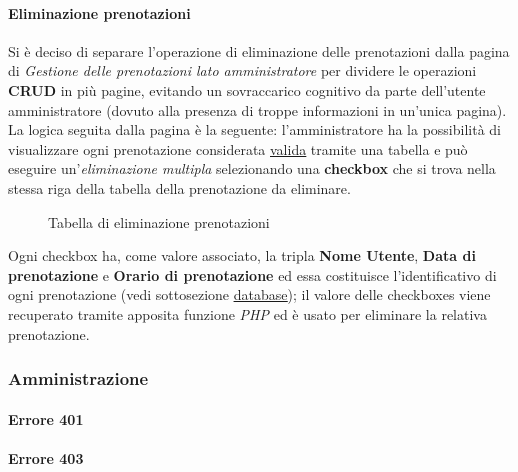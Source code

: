 \documentclass[]{article}
\begin{document}
\paragraph*{Eliminazione prenotazioni}
Si è deciso di separare l'operazione di eliminazione delle prenotazioni dalla pagina di \textit{Gestione delle prenotazioni lato amministratore} per dividere le operazioni \textbf{CRUD} in più pagine, evitando un sovraccarico cognitivo da parte dell'utente amministratore (dovuto alla presenza di troppe informazioni in un'unica pagina). \\
La logica seguita dalla pagina è la seguente: l'amministratore ha la possibilità di visualizzare ogni prenotazione considerata \hyperref[prenotazioni:valida]{\underline{valida}} tramite una tabella e può eseguire un'\textit{eliminazione multipla} selezionando una \textbf{checkbox} che si trova nella stessa riga della tabella della prenotazione da eliminare. \\

\begin{figure}[H]
	\centering
	\caption{Tabella di eliminazione prenotazioni}
\end{figure}

Ogni checkbox ha, come valore associato, la tripla \textbf{Nome Utente}, \textbf{Data di prenotazione} e \textbf{Orario di prenotazione} ed essa costituisce l'identificativo di ogni prenotazione (vedi sottosezione \hyperref[subsec:database]{\underline{database}}); il valore delle checkboxes viene recuperato tramite apposita funzione \textit{PHP} ed è usato per eliminare la relativa prenotazione.

\subsubsection{Amministrazione}
\paragraph*{Errore 401}
\paragraph*{Errore 403}
\end{document}
